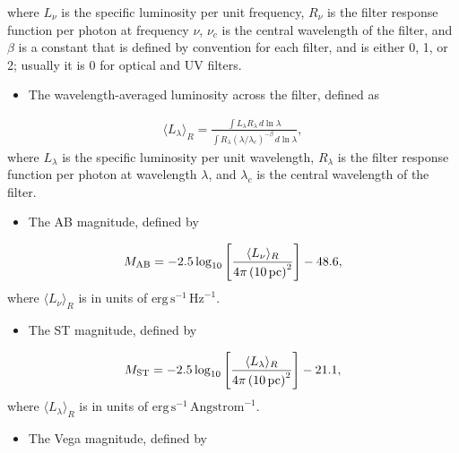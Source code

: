 \documentclass[letterpaper,10pt,english]{sphinxmanual}
\begin{document}
where \(L_\nu\) is the specific luminosity per unit frequency, \(R_\nu\) is the filter response function per photon at frequency \(\nu\), \(\nu_c\) is the central wavelength of the filter, and \(\beta\) is a constant that is defined by convention for each filter, and is either 0, 1, or 2; usually it is 0 for optical and UV filters.
\begin{itemize}
\item {} 
The wavelength-averaged luminosity across the filter, defined as

\end{itemize}
\begin{equation*}
\begin{split}\langle L_\lambda\rangle_R = \frac{\int L_\lambda R_\lambda \, d\ln\lambda}{\int R_\lambda (\lambda/\lambda_c)^{-\beta} \, d\ln\lambda},\end{split}
\end{equation*}
where \(L_\lambda\) is the specific luminosity per unit wavelength, \(R_\lambda\) is the filter response function per photon at wavelength \(\lambda\), and \(\lambda_c\) is the central wavelength of the filter.
\begin{itemize}
\item {} 
The AB magnitude, defined by

\end{itemize}
\begin{equation*}
\begin{split}M_{\rm AB} = -2.5 \log_{10} \left[\frac{\langle L_\nu\rangle_R}{4\pi\left(10\,\mathrm{pc}\right)^2}\right] - 48.6,\end{split}
\end{equation*}
where \(\langle L_\nu\rangle_R\) is in units of \(\mathrm{erg\,s}^{-1}\,\mathrm{Hz}^{-1}\).
\begin{itemize}
\item {} 
The ST magnitude, defined by

\end{itemize}
\begin{equation*}
\begin{split}M_{\rm ST} = -2.5 \log_{10} \left[\frac{\langle L_\lambda\rangle_R}{4\pi\left(10\,\mathrm{pc}\right)^2}\right] - 21.1,\end{split}
\end{equation*}
where \(\langle L_\lambda\rangle_R\) is in units of \(\mathrm{erg\, s}^{-1}\,\mathrm{Angstrom}^{-1}\).
\begin{itemize}
\item {} 
The Vega magnitude, defined by

\end{itemize}
\end{document}
